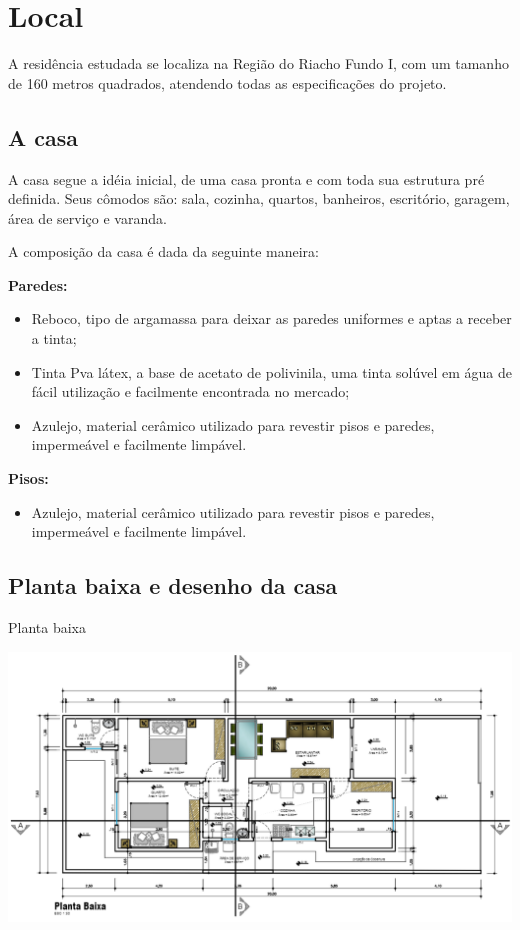 \section{Local}
A residência estudada se localiza na Região do Riacho Fundo I, com um tamanho de 160 metros quadrados, atendendo todas as especificações do projeto.

\subsection{A casa}
\par A casa segue a idéia inicial, de uma casa pronta e com toda sua estrutura pré definida. Seus cômodos são: sala, cozinha, quartos, banheiros, escritório, garagem, área de serviço e varanda.
\par A composição da casa é dada da seguinte maneira:
\par \textbf{Paredes:}
    \begin{itemize}
        \item Reboco, tipo de argamassa para deixar as paredes uniformes e aptas a receber a tinta;
        \item Tinta Pva látex, a base de acetato de polivinila, uma tinta solúvel em água de fácil utilização e facilmente encontrada no mercado;
        \item Azulejo, material cerâmico utilizado para revestir pisos e paredes, impermeável e facilmente limpável.
    \end{itemize}
\par \textbf{Pisos:}
    \begin{itemize}
        \item Azulejo, material cerâmico utilizado para revestir pisos e paredes, impermeável e facilmente limpável.
    \end{itemize}
\subsection{Planta baixa e desenho da casa}

\begin{center}
\caption{Planta baixa}
\includegraphics[width=\textwidth]{figuras/planta}
\end{center}

